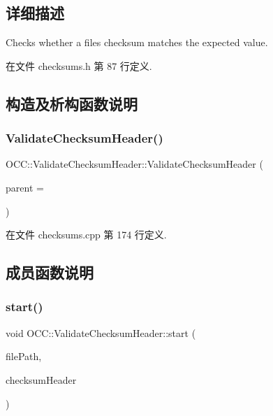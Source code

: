 \subsection{详细描述}
Checks whether a file\textquotesingle{}s checksum matches the expected value. 

在文件 checksums.\+h 第 87 行定义.



\subsection{构造及析构函数说明}
\mbox{\label{class_o_c_c_1_1_validate_checksum_header_abd3865ec71e5d30d56f48bde20e337e2}} 
\subsubsection{\texorpdfstring{Validate\+Checksum\+Header()}{ValidateChecksumHeader()}}
{\footnotesize\ttfamily O\+C\+C\+::\+Validate\+Checksum\+Header\+::\+Validate\+Checksum\+Header (\begin{DoxyParamCaption}\item[{Q\+Object $\ast$}]{parent = {} }\end{DoxyParamCaption})\hspace{0.3cm}{\ttfamily [explicit]}}



在文件 checksums.\+cpp 第 174 行定义.



\subsection{成员函数说明}
\mbox{\label{class_o_c_c_1_1_validate_checksum_header_a0100eb8ff9c87c770660d15e69a92ead}} 
\subsubsection{\texorpdfstring{start()}{start()}}
{\footnotesize\ttfamily void O\+C\+C\+::\+Validate\+Checksum\+Header\+::start (\begin{DoxyParamCaption}\item[{const Q\+String \&}]{file\+Path,  }\item[{const Q\+Byte\+Array \&}]{checksum\+Header }\end{DoxyParamCaption})}

